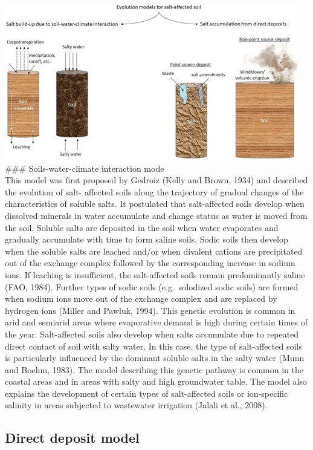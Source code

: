 \documentclass[
  10pt,
  b5paper,
]{book}
\begin{document}
\includegraphics{figures/images/Figure2.1.jpg}\\
\#\#\# Soils-water-climate interaction mode\\
This model was first proposed by Gedroiz (Kelly and Brown, 1934) and described the evolution of salt- affected soils along the trajectory of gradual changes of the characteristics of soluble salts. It postulated that salt-affected soils develop when dissolved minerals in water accumulate and change status as water is moved from the soil. Soluble salts are deposited in the soil when water evaporates and gradually accumulate with time to form saline soils. Sodic soils then develop when the soluble salts are leached and/or when divalent cations are precipitated out of the exchange complex followed by the corresponding increase in sodium ions. If leaching is insufficient, the salt-affected soils remain predominantly saline (FAO, 1984). Further types of sodic soils (e.g.~solodized sodic soils) are formed when sodium ions move out of the exchange complex and are replaced by hydrogen ions (Miller and Pawluk, 1994). This genetic evolution is common in arid and semiarid areas where evaporative demand is high during certain times of the year.
Salt-affected soils also develop when salts accumulate due to repeated direct contact of soil with salty water. In this case, the type of salt-affected soils is particularly influenced by the dominant soluble salts in the salty water (Munn and Boehm, 1983). The model describing this genetic pathway is common in the coastal areas and in areas with salty and high groundwater table. The model also explains the development of certain types of salt-affected soils or ion-specific salinity in areas subjected to wastewater irrigation (Jalali et al., 2008).

\hypertarget{direct-deposit-model}{%
\subsection{Direct deposit model}\label{direct-deposit-model}}
\end{document}
